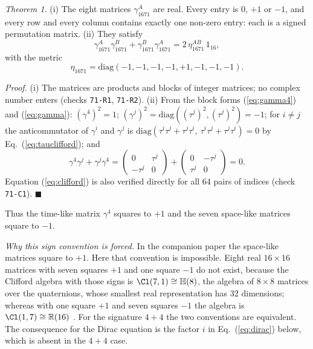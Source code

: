 \emph{Theorem 1.} (i) The eight matrices $\gamma_{1671}^A$ are real. Every entry is $0$, $+1$ or $-1$,
and every row and every column contains exactly one non-zero entry: each is a signed permutation
matrix. (ii) They satisfy
\begin{equation}
\gamma_{1671}^A\gamma_{1671}^B+\gamma_{1671}^B\gamma_{1671}^A=2\,\eta_{1671}^{AB}\,1_{16},
\label{eq:clifford}
\end{equation}
with the metric
\begin{equation}
\eta_{1671}=\mathrm{diag}(-1,-1,-1,-1,+1,-1,-1,-1).
\label{eq:eta}
\end{equation}

\emph{Proof.} (i) The matrices are products and blocks of integer matrices; no complex number enters
(checks \texttt{71-R1}, \texttt{71-R2}). (ii) From the block forms (\ref{eq:gamma4}) and
(\ref{eq:gamma}): $(\gamma^4)^2=1$; $(\gamma^j)^2=\mathrm{diag}((\tau^j)^2,(\tau^j)^2)=-1$; for
$i\neq j$ the anticommutator of $\gamma^i$ and $\gamma^j$ is
$\mathrm{diag}(\tau^i\tau^j+\tau^j\tau^i,\ \tau^i\tau^j+\tau^j\tau^i)=0$ by
Eq.~(\ref{eq:tauclifford}); and
\begin{equation*}
\gamma^4\gamma^j+\gamma^j\gamma^4=\begin{pmatrix}0&\tau^j\\-\tau^j&0\end{pmatrix}+\begin{pmatrix}0&-\tau^j\\ \tau^j&0\end{pmatrix}=0 .
\end{equation*}
Equation (\ref{eq:clifford}) is also verified directly for all 64 pairs of indices (check
\texttt{71-C1}). $\blacksquare$

Thus the time-like matrix $\gamma^4$ squares to $+1$ and the seven space-like matrices square to
$-1$.

\emph{Why this sign convention is forced.} In the companion paper the space-like matrices square to
$+1$. Here that convention is impossible. Eight real $16\times16$ matrices with seven squares $+1$
and one square $-1$ do not exist, because the Clifford algebra with those signs is
$\Cl(7,1)\cong\mathbb{H}(8)$, the algebra of $8\times8$ matrices over the quaternions, whose smallest
real representation has 32 dimensions; whereas with one square $+1$ and seven squares $-1$ the algebra
is $\Cl(1,7)\cong\mathbb{R}(16)$ \cite{AtiyahBottShapiro1964,LawsonMichelsohn1989}. For the signature
$4+4$ the two conventions are equivalent. The consequence for the Dirac equation is the factor $i$ in
Eq.~(\ref{eq:dirac}) below, which is absent in the $4+4$ case.

